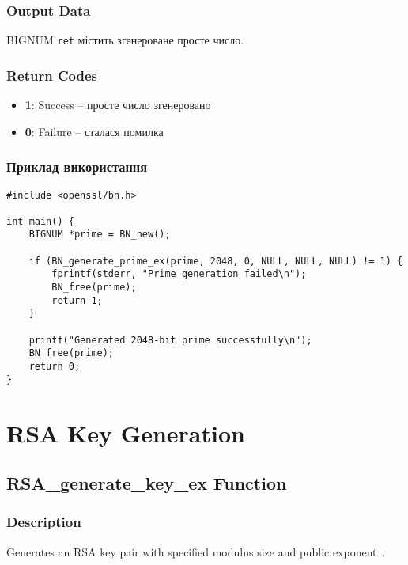 \subsubsection{Output Data}
BIGNUM \texttt{ret}  містить згенероване просте число.

\subsubsection{Return Codes}
\begin{itemize}
    \item \textbf{1}: Success -- просте число згенеровано
    \item \textbf{0}: Failure -- сталася помилка
\end{itemize}

\subsubsection{Приклад використання}
\begin{verbatim}
#include <openssl/bn.h>

int main() {
    BIGNUM *prime = BN_new();
    
    if (BN_generate_prime_ex(prime, 2048, 0, NULL, NULL, NULL) != 1) {
        fprintf(stderr, "Prime generation failed\n");
        BN_free(prime);
        return 1;
    }
    
    printf("Generated 2048-bit prime successfully\n");
    BN_free(prime);
    return 0;
}
\end{verbatim} 

\section{RSA Key Generation}

\subsection{RSA\_generate\_key\_ex Function}

\subsubsection{Description}
Generates an RSA key pair with specified modulus size and public exponent~\cite{rivest1978method, menezes1996handbook}.

